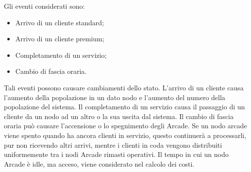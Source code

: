 \documentclass{article}
\begin{document}
Gli eventi considerati sono:
\begin{itemize}
\item Arrivo di un cliente standard;
\item Arrivo di un cliente premium;
\item Completamento di un servizio;
\item Cambio di fascia oraria.
\end{itemize}
Tali eventi possono causare cambiamenti dello stato. L’arrivo di un cliente causa
l’aumento della popolazione in un dato nodo e l’aumento del numero della popolazione del sistema. Il completamento di un servizio causa il passaggio di un cliente da un
nodo ad un altro o la sua uscita dal sistema. Il cambio di fascia oraria può causare
l’accensione o lo spegnimento degli Arcade. Se un nodo arcade viene spento quando ha ancora
clienti in servizio, questo continuerà a processarli, pur non ricevendo altri
arrivi, mentre i clienti in coda vengono distribuiti uniformemente tra i nodi Arcade rimasti operativi. Il tempo in cui un nodo Arcade è idle, ma acceso, viene considerato nel calcolo dei
costi.
\end{document}
